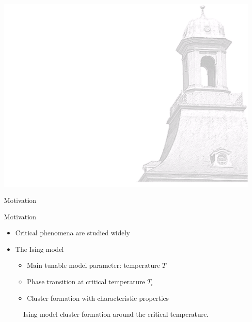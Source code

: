 \documentclass[xcolor=dvipsnames]{beamer}
\begin{document}
    {\usebackgroundtemplate%
        {%
            \includegraphics[width=\paperwidth,height=\paperheight]{bkg1.pdf}%
        }
        \begin{frame}
            \centering \Huge \color{ublue} Motivation
            \thispagestyle{empty}
            \addtocounter{framenumber}{-1}
        \end{frame}
    }
    
    \begin{frame}{Motivation}
        \begin{itemize}
            \item Critical phenomena are studied widely
            \item The Ising model%
            \begin{itemize}
                \item Main tunable model parameter: temperature $T$
                \item Phase transition at critical temperature $T_{\mathrm{c}}$
                \item Cluster formation with characteristic properties
            \end{itemize}
        \end{itemize}
        \begin{figure}[htb]
            \centering
            \caption{Ising model cluster formation around the critical temperature.}
            \label{fig:}
        \end{figure}
    \end{frame}
\end{document}
